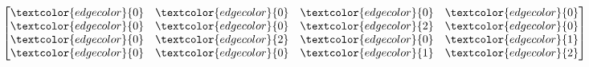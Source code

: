\documentclass[tikz]{standalone}
\begin{document}
\[
\begin{bmatrix}
 \textcolor{edgecolor}{0} & \textcolor{edgecolor}{0} & \textcolor{edgecolor}{0} & \textcolor{edgecolor}{0} \\
 \textcolor{edgecolor}{0} & \textcolor{edgecolor}{0} & \textcolor{edgecolor}{2} & \textcolor{edgecolor}{0} \\
 \textcolor{edgecolor}{0} & \textcolor{edgecolor}{2} & \textcolor{edgecolor}{0} & \textcolor{edgecolor}{1} \\
 \textcolor{edgecolor}{0} & \textcolor{edgecolor}{0} & \textcolor{edgecolor}{1} & \textcolor{edgecolor}{2} \\
\end{bmatrix}
\]

\end{document}
